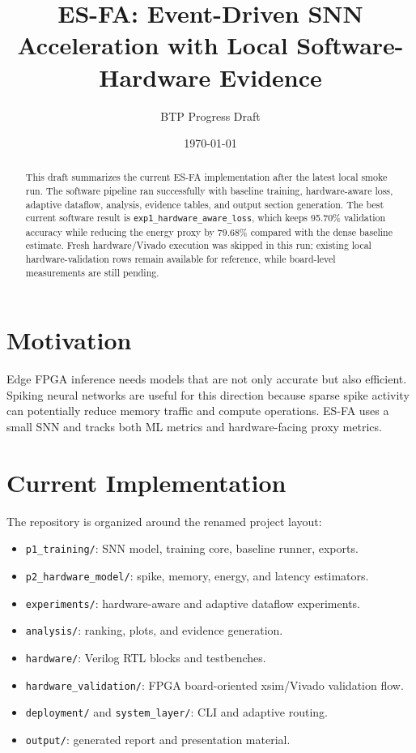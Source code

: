 \documentclass[11pt]{article}
\title{ES-FA: Event-Driven SNN Acceleration with Local Software-Hardware Evidence}
\author{BTP Progress Draft}
\date{\today}
\begin{document}
\maketitle

\begin{abstract}
This draft summarizes the current ES-FA implementation after the latest local
smoke run. The software pipeline ran successfully with baseline training,
hardware-aware loss, adaptive dataflow, analysis, evidence tables, and output
section generation. The best current software result is
\texttt{exp1\_hardware\_aware\_loss}, which keeps 95.70\% validation accuracy
while reducing the energy proxy by 79.68\% compared with the dense baseline
estimate. Fresh hardware/Vivado execution was skipped in this run; existing
local hardware-validation rows remain available for reference, while board-level
measurements are still pending.
\end{abstract}

\section{Motivation}
Edge FPGA inference needs models that are not only accurate but also efficient.
Spiking neural networks are useful for this direction because sparse spike
activity can potentially reduce memory traffic and compute operations. ES-FA
uses a small SNN and tracks both ML metrics and hardware-facing proxy metrics.

\section{Current Implementation}
The repository is organized around the renamed project layout:
\begin{itemize}
\item \texttt{p1\_training/}: SNN model, training core, baseline runner, exports.
\item \texttt{p2\_hardware\_model/}: spike, memory, energy, and latency estimators.
\item \texttt{experiments/}: hardware-aware and adaptive dataflow experiments.
\item \texttt{analysis/}: ranking, plots, and evidence generation.
\item \texttt{hardware/}: Verilog RTL blocks and testbenches.
\item \texttt{hardware\_validation/}: FPGA board-oriented xsim/Vivado validation flow.
\item \texttt{deployment/} and \texttt{system\_layer/}: CLI and adaptive routing.
\item \texttt{output/}: generated report and presentation material.
\end{itemize}
\end{document}
